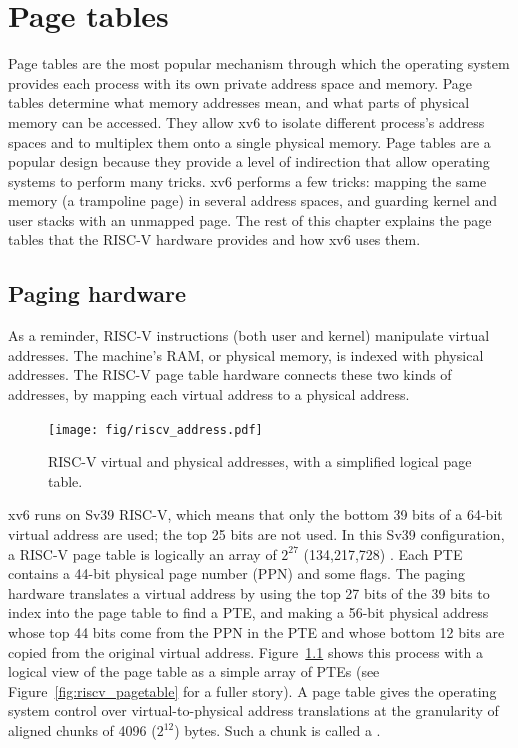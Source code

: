 \chapter{Page tables}
\label{CH:MEM}

Page tables are the most popular mechanism through which the operating
system provides each process with its own private address space and
memory.  Page tables determine what memory addresses mean, and what
parts of physical memory can be accessed. They allow xv6 to isolate
different process's address spaces and to multiplex them onto a single
physical memory. Page tables are a popular design because they provide
a level of indirection that allow operating systems to perform many
tricks. xv6 performs a few tricks: mapping the same memory
(a trampoline page) in several address spaces, and guarding kernel and
user stacks with an unmapped page. The rest of this chapter explains
the page tables that the RISC-V hardware provides and how xv6 uses
them.

\section{Paging hardware}
As a reminder,
RISC-V instructions (both user and kernel) manipulate virtual addresses.
The machine's RAM, or physical memory, is indexed with physical
addresses.
The RISC-V page table hardware connects these two kinds of addresses,
by mapping each virtual address to a physical address.

\begin{figure}[t]
\center
\texttt{[image: fig/riscv\_address.pdf]}
\caption{RISC-V virtual and physical addresses, with a simplified
logical page table.}
\label{fig:riscv_address}
\end{figure}

xv6 runs on Sv39 RISC-V, which means that only the bottom 39
bits of a 64-bit virtual address are used; the top 25 bits
are not used.
In this Sv39 configuration, a
RISC-V page table is logically an array of $2^{27}$ (134,217,728)
.  Each PTE contains a 44-bit
physical page number (PPN) and some flags. The paging hardware
translates a virtual address by using the top 27 bits of the 39 bits
to index into the page table to find a PTE, and making a 56-bit
physical address whose top 44 bits come from the PPN in the PTE
and whose bottom 12 bits are copied from the original virtual address.
Figure~\ref{fig:riscv_address} shows this
process with a logical view of the page table as a simple array of PTEs
(see Figure~\ref{fig:riscv_pagetable} for a fuller story).
A page table
gives the operating system control over virtual-to-physical address
translations at the granularity of aligned chunks of 4096 ($2^{12}$)
bytes.  Such a chunk is called a .

